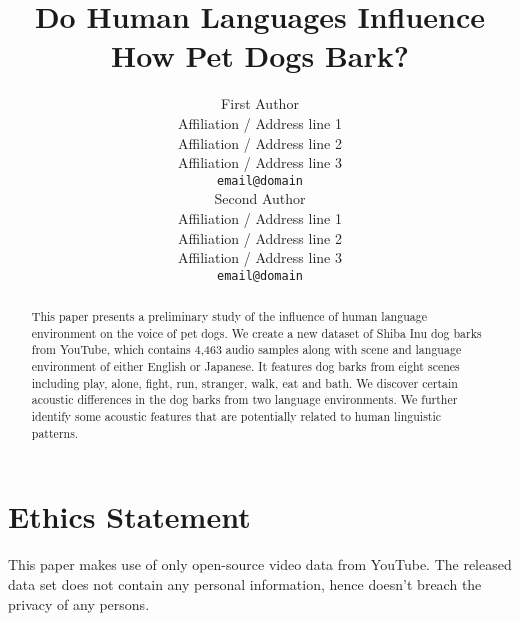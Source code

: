 \documentclass[11pt]{article}
\title{Do Human Languages Influence How Pet Dogs Bark?}
\author{First Author \\
	Affiliation / Address line 1 \\
	Affiliation / Address line 2 \\
	Affiliation / Address line 3 \\
	\texttt{email@domain} \\\And
	Second Author \\
	Affiliation / Address line 1 \\
	Affiliation / Address line 2 \\
	Affiliation / Address line 3 \\
	\texttt{email@domain} \\}
\newcommand{\KZ}[1]{\textcolor{blue}{(Kenny: #1)}}
\begin{document}
\maketitle
\begin{abstract}
This paper presents a preliminary study of the influence of human language environment on the voice of pet dogs. We create a new dataset of Shiba Inu dog barks from YouTube, which contains 4,463 audio samples along with scene and language environment of either English or Japanese. It features dog barks from eight scenes including play, alone, fight, run, stranger, walk, eat and bath. We discover certain acoustic differences in the dog barks from two language environments. We further identify some acoustic features that are potentially related to human linguistic patterns.
\end{abstract}





\section*{Ethics Statement}
This paper makes use of only open-source video data from YouTube. The released data set does not contain any personal information, hence doesn't breach the privacy of any persons.
\appendix
%



\clearpage
\newpage
\appendix

\end{document}
